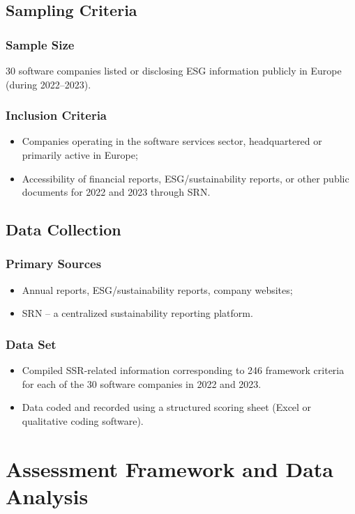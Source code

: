 \subsection{Sampling Criteria}
\subsubsection{Sample Size}
30 software companies listed or disclosing ESG information publicly in Europe (during 2022--2023).

\subsubsection{Inclusion Criteria}
\begin{itemize}
    \item Companies operating in the software services sector, headquartered or primarily active in Europe;
    \item Accessibility of financial reports, ESG/sustainability reports, or other public documents for 2022 and 2023 through SRN.
\end{itemize}

\subsection{Data Collection}
\subsubsection{Primary Sources}
\begin{itemize}
    \item Annual reports, ESG/sustainability reports, company websites;
    \item SRN -- a centralized sustainability reporting platform.
\end{itemize}

\subsubsection{Data Set}
\begin{itemize}
    \item Compiled SSR-related information corresponding to 246 framework criteria for each of the 30 software companies in 2022 and 2023.
    \item Data coded and recorded using a structured scoring sheet (Excel or qualitative coding software).
\end{itemize}

\section{Assessment Framework and Data Analysis}
